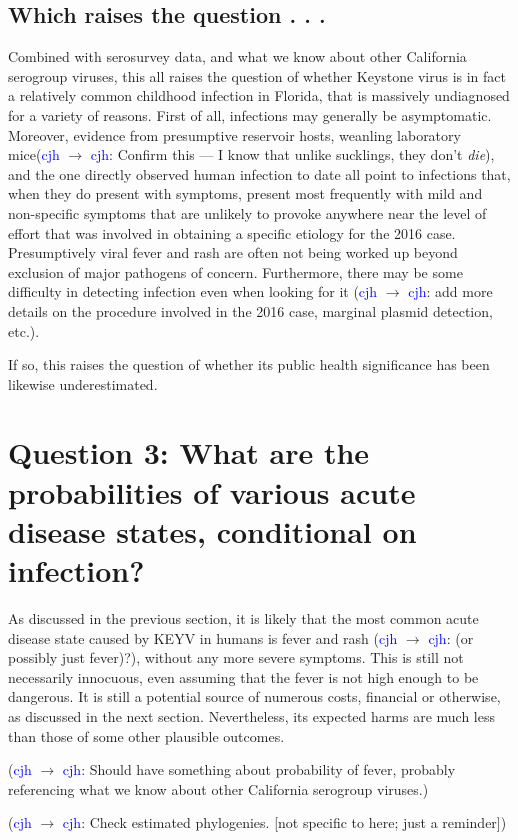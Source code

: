 \documentclass[12pt]{article}
\newcommand{\cjh}{\textcolor{blue}{cjh}}
\newcommand{\msg}[3]{(#1 $\rightarrow$ #2: #3)}
\newcommand{\mcc}[1]{\msg\cjh\cjh{#1}}
\begin{document}
        \subsection{Which raises the question . . .}
            Combined with serosurvey data, and what we know about other California serogroup viruses, this all raises the question of whether Keystone virus is in fact a relatively common childhood infection in Florida, that is massively undiagnosed for a variety of reasons. First of all, infections may generally be asymptomatic. Moreover, evidence from presumptive reservoir hosts, weanling laboratory mice\mcc{Confirm this --- I know that unlike sucklings, they don't \textit{die}}, and the one directly observed human infection to date all point to infections that, when they do present with symptoms, present most frequently with mild and non-specific symptoms that are unlikely to provoke anywhere near the level of effort that was involved in obtaining a specific etiology for the 2016 case. Presumptively viral fever and rash are often not being worked up beyond exclusion of major pathogens of concern. Furthermore, there may be some difficulty in detecting infection even when looking for it \mcc{add more details on the procedure involved in the 2016 case, marginal plasmid detection, etc.}.

            If so, this raises the question of whether its public health significance has been likewise underestimated.


    \section[Probabilities of disease, given infection]{Question 3: What are the probabilities of various acute disease states, conditional on infection?}
        As discussed in the previous section, it is likely that the most common acute disease state caused by KEYV in humans is fever and rash \mcc{(or possibly just fever)?}, without any more severe symptoms. This is still not necessarily innocuous, even assuming that the fever is not high enough to be dangerous. It is still a potential source of numerous costs, financial or otherwise, as discussed in the next section. Nevertheless, its expected harms are much less than those of some other plausible outcomes.

        \mcc{Should have something about probability of fever, probably referencing what we know about other California serogroup viruses.}

        \mcc{Check estimated phylogenies. [not specific to here; just a reminder]}
\end{document}
